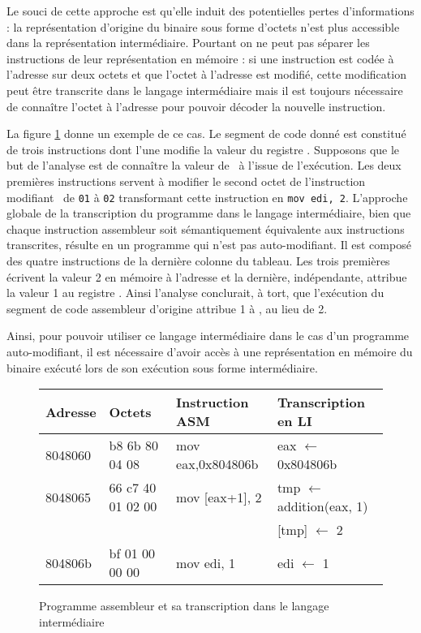 Le souci de cette approche est qu'elle induit des potentielles pertes d'informations : la représentation d'origine du binaire sous forme d'octets n'est plus accessible dans la représentation intermédiaire.
Pourtant on ne peut pas séparer les instructions de leur représentation en mémoire : si une instruction est codée à l'adresse  sur deux octets et que l'octet à l'adresse  est modifié, cette modification peut être transcrite dans le langage intermédiaire mais il est toujours nécessaire de connaître l'octet à l'adresse  pour pouvoir décoder la nouvelle instruction.

La figure \ref{fig:prg_asm_li} donne un exemple de ce cas. Le segment de code donné est constitué de trois instructions dont l'une modifie la valeur du registre \edi. Supposons que le but de l'analyse est de connaître la valeur de \edi\ à l'issue de l'exécution.
Les deux premières instructions servent à modifier le second octet de l'instruction modifiant \edi\ de \texttt{01} à \texttt{02} transformant cette instruction en \texttt{mov edi, 2}.
L'approche globale de la transcription du programme dans le langage intermédiaire, bien que chaque instruction assembleur soit sémantiquement équivalente aux instructions transcrites, résulte en un programme qui n'est pas auto-modifiant. Il est composé des quatre instructions de la dernière colonne du tableau.
Les trois premières écrivent la valeur 2 en mémoire à l'adresse  et la dernière, indépendante, attribue la valeur 1 au registre \edi.
Ainsi l'analyse conclurait, à tort, que l'exécution du segment de code assembleur d'origine attribue 1 à \edi, au lieu de 2.

Ainsi, pour pouvoir utiliser ce langage intermédiaire dans le cas d'un programme auto-modifiant, il est nécessaire d'avoir accès à une représentation en mémoire du binaire exécuté lors de son exécution sous forme intermédiaire.

\begin{figure}
\begin{center}
\begin{tabular}[b]{|l|l|l|l|}
\hline
Adresse & Octets & Instruction ASM & Transcription en LI\\ 
\hline
 8048060  &  b8 6b 80 04 08         &  mov    eax,0x804806b & eax $\leftarrow$ 0x804806b\\
 8048065  &  66 c7 40 01 02 00      &  mov    [eax+1], 2 & tmp $\leftarrow$ addition(eax, 1)\\
          &                         &                                & [tmp] $\leftarrow$ 2 \\
 804806b  &  bf 01 00 00 00         &  mov    edi, 1 & edi $\leftarrow$ 1 \\
\hline
\end{tabular}
\end{center}
\caption{Programme assembleur et sa transcription dans le langage intermédiaire}
\label{fig:prg_asm_li}
\end{figure}

